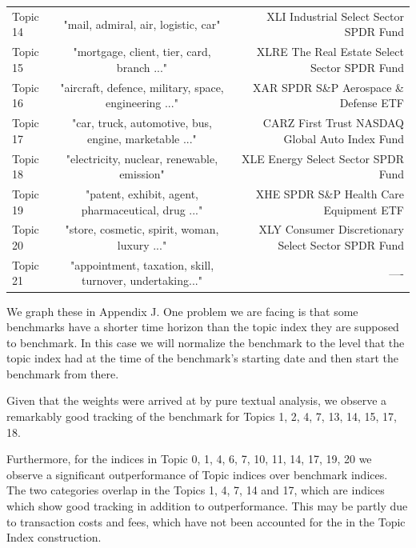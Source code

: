 \documentclass[12pt,journal,letterpaper,oneside,onecolumn]{IEEEtran}
\begin{document}
\begin{table}[!ht]
\begin{center}
\begin{tabular}{l|c|r}
      Topic 14 & "mail, admiral, air, logistic, car" & XLI Industrial Select Sector SPDR Fund \\
      Topic 15 & "mortgage, client, tier, card, branch ..." & XLRE The Real Estate Select Sector SPDR Fund  \\
      Topic 16 & "aircraft, defence, military, space, engineering ..." & XAR SPDR S\&P Aerospace \& Defense ETF \\
      Topic 17 & "car, truck, automotive, bus, engine, marketable ..." & CARZ First Trust NASDAQ Global Auto Index Fund \\
      Topic 18 & "electricity, nuclear, renewable, emission" & XLE Energy Select Sector SPDR Fund \\
      Topic 19 & "patent, exhibit, agent, pharmaceutical, drug ..." & XHE SPDR S\&P Health Care Equipment ETF \\
      Topic 20 & "store, cosmetic, spirit, woman, luxury ..." & XLY Consumer Discretionary Select Sector SPDR Fund \\
      Topic 21 & "appointment, taxation, skill, turnover, undertaking..." & ---- \\
    \end{tabular}
  \end{center} 
\end{table}

We graph these in Appendix J. One problem we are facing is that some benchmarks have a shorter time horizon than the topic index they are supposed to benchmark. In this case we will normalize the benchmark to the level that the topic index had at the time of the benchmark's starting date and then start the benchmark from there.

Given that the weights were arrived at by pure textual analysis, we observe a remarkably good tracking of the benchmark for Topics 1, 2, 4, 7, 13, 14, 15, 17, 18. 

Furthermore, for the indices in Topic 0, 1, 4, 6, 7, 10, 11, 14, 17, 19, 20 we observe a significant outperformance of Topic indices over benchmark indices. 
The two categories overlap in the Topics 1, 4, 7, 14 and 17, which are indices which show good tracking in addition to outperformance.
This may be partly due to transaction costs and fees, which have not been accounted for the in the Topic Index construction.
\end{document}

